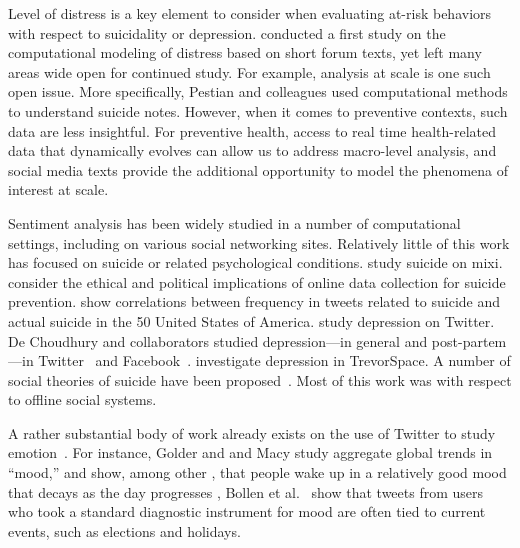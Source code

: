 \documentclass[11pt]{article}
\begin{document}
Level of distress is a key element to consider when evaluating at-risk behaviors with respect to suicidality or depression.  conducted a first study on the computational modeling of distress based on short forum texts, yet left many areas wide open for continued study. For example, analysis at scale is one such open issue. More specifically, Pestian and colleagues \cite{pestinaetal2009,pestinaetal2008} used computational methods to understand suicide notes. However, when it comes to preventive contexts, such data are less insightful. For preventive health, access to real time health-related data that dynamically evolves can allow us to address macro-level analysis, and social media texts provide the additional opportunity to model the phenomena of interest at scale.

Sentiment analysis has been widely studied in a number of computational settings, including on various social networking sites. Relatively little of this work has focused on suicide or related psychological conditions.  study suicide on mixi.  consider the ethical and political implications of online data collection for suicide prevention.  show correlations between frequency in tweets related to suicide and actual suicide in the 50 United States of America.  study depression on Twitter. De Choudhury and collaborators studied depression---in general and post-partem---in Twitter~\cite{de2012not,de2012happy,de2013major,de2013understanding} and Facebook~\cite{de2014characterizing}.  investigate depression in TrevorSpace. A number of social theories of suicide have been proposed~\cite{wray2011sociology}. Most of this work was with respect to offline social systems. 

A rather substantial body of work already exists on the use of Twitter to study emotion~\cite{bollen2011twitter,dodds2011temporal,wang2012harnessing,pfitzner2012emotional,kim2012you,bollen2011happiness,pfitzner2012emotional,bollen2011modeling,mohammad2012emotional,golder2011diurnal,de2012not,de2012happy,de2013major,de2013understanding,hannak2012tweetin,thelwall2011sentiment,pak2010twitter}. For instance,
Golder and and Macy study aggregate global trends in ``mood,'' and show, among other , that people wake up in a relatively good mood that decays as the day progresses \cite{golder2011diurnal}, Bollen et al.~\cite{bollen2011modeling} show that tweets from users who took a standard diagnostic instrument for mood are often tied to current events, such as elections and holidays.
\end{document}
